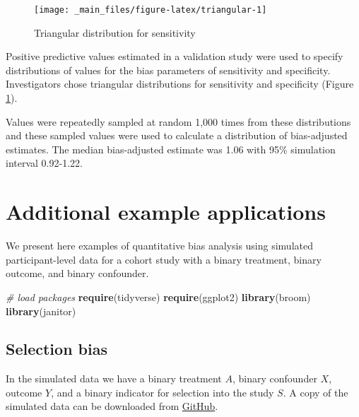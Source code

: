 \documentclass[
]{book}
\newenvironment{Shaded}{\begin{snugshade}}{\end{snugshade}}
\newcommand{\CommentTok}[1]{\textcolor[rgb]{0.56,0.35,0.01}{\textit{#1}}}
\newcommand{\FunctionTok}[1]{\textcolor[rgb]{0.13,0.29,0.53}{\textbf{#1}}}
\newcommand{\NormalTok}[1]{#1}
\begin{document}
\begin{figure}

{\centering \texttt{[image: \_main\_files/figure-latex/triangular-1]} 

}

\caption{Triangular distribution for sensitivity}\label{fig:triangular}
\end{figure}

Positive predictive values estimated in a validation study were used to specify distributions of values for the bias parameters of sensitivity and specificity. Investigators chose triangular distributions for sensitivity and specificity (Figure \ref{fig:triangular}).

Values were repeatedly sampled at random 1,000 times from these distributions and these sampled values were used to calculate a distribution of bias-adjusted estimates. The median bias-adjusted estimate was 1.06 with 95\% simulation interval 0.92-1.22.

\hypertarget{additional-examples}{%
\chapter{Additional example applications}\label{additional-examples}}

We present here examples of quantitative bias analysis using simulated participant-level data for a cohort study with a binary treatment, binary outcome, and binary confounder.

\begin{Shaded}
\begin{Highlighting}[]
\CommentTok{\# load packages}
\FunctionTok{require}\NormalTok{(tidyverse)}
\FunctionTok{require}\NormalTok{(ggplot2)}
\FunctionTok{library}\NormalTok{(broom) }
\FunctionTok{library}\NormalTok{(janitor)}
\end{Highlighting}
\end{Shaded}

\hypertarget{selection-bias}{%
\section{Selection bias}\label{selection-bias}}

In the simulated data we have a binary treatment \(A\), binary confounder \(X\), outcome \(Y\), and a binary indicator for selection into the study \(S\). A copy of the simulated data can be downloaded from \href{https://github.com/jeremy-p-b/qba-applied/tree/main/data}{GitHub}.
\end{document}
